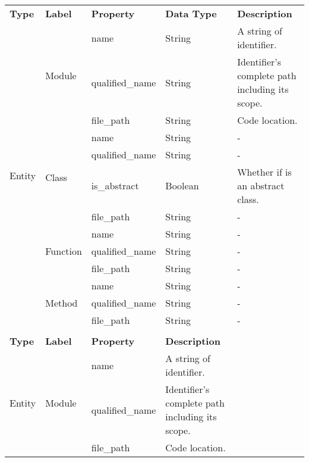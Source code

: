 \begin{tabular}{p{1.6cm}|p{1.7cm}|p{2cm}|p{3.3cm}|p{7.5cm}}
\hline
\textbf{Type} & \textbf{Label} & \textbf{Property} & \textbf{Data Type} & \textbf{Description} \\
\cline{1-1}\cline{2-2}\cline{3-3}\cline{4-4}\cline{5-5}
\multirow{13}{*}{Entity} & \multirow{3}{*}{Module} & name & String & A string of identifier. \\
\cline{3-3}\cline{4-4}\cline{5-5}
 &  & qualified\_name & String & Identifier's complete path including its scope. \\
\cline{3-3}\cline{4-4}\cline{5-5}
 &  & file\_path & String & Code location. \\
\cline{2-2}\cline{3-3}\cline{4-4}\cline{5-5}
 & \multirow{4}{*}{Class} & name & String & - \\
\cline{3-3}\cline{4-4}\cline{5-5}
 &  & qualified\_name & String & - \\
\cline{3-3}\cline{4-4}\cline{5-5}
 &  & is\_abstract & Boolean & Whether if is an abstract class. \\
\cline{3-3}\cline{4-4}\cline{5-5}
 &  & file\_path & String & - \\
\cline{2-2}\cline{3-3}\cline{4-4}\cline{5-5}
 & \multirow{3}{*}{Function} & name & String & - \\
\cline{3-3}\cline{4-4}\cline{5-5}
 &  & qualified\_name & String & - \\
\cline{3-3}\cline{4-4}\cline{5-5}
 &  & file\_path & String & - \\
\cline{2-2}\cline{3-3}\cline{4-4}\cline{5-5}
 & \multirow{3}{*}{Method} & name & String & - \\
\cline{3-3}\cline{4-4}\cline{5-5}
 &  & qualified\_name & String & - \\
\cline{3-3}\cline{4-4}\cline{5-5}
 &  & file\_path & String & - \\
\cline{1-1}\cline{2-2}\cline{3-3}\cline{4-4}\cline{5-5}
 &  &  &  &  \\
\cline{1-1}\cline{2-2}\cline{3-3}\cline{4-4}\cline{5-5}
\textbf{Type} & \textbf{Label} & \textbf{Property} & \textbf{Description} &  \\
\cline{1-1}\cline{2-2}\cline{3-3}\cline{4-4}\cline{5-5}
\multirow{13}{*}{Entity} & \multirow{3}{*}{Module} & name & A string of identifier. &  \\
\cline{3-3}\cline{4-4}\cline{5-5}
 &  & qualified\_name & Identifier's complete path including its scope. &  \\
\cline{3-3}\cline{4-4}\cline{5-5}
 &  & file\_path & Code location. &  \\

\end{tabular}
